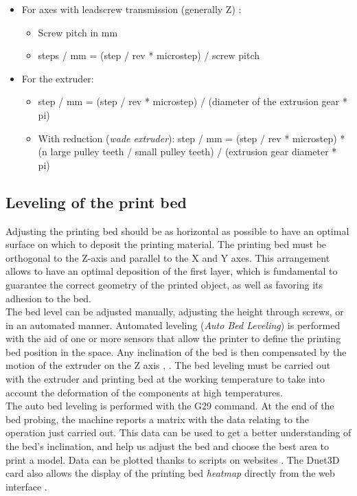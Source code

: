 \begin{itemize}
\item For axes with leadscrew transmission (generally Z) \parencite{Reference51}:

\begin{itemize}
\item Screw pitch in mm
\item steps / mm = (step / rev * microstep) / screw pitch
\end{itemize}

\item For the extruder:

\begin {itemize}
\item step / mm = (step / rev * microstep) / (diameter of the extrusion gear * pi)
\item With reduction (\emph{wade extruder}): step / mm = (step / rev * microstep) * (n large pulley teeth / small pulley teeth) / (extrusion gear diameter * pi)
\end{itemize}

\end{itemize}

\subsection{Leveling of the print bed}
Adjusting the printing bed should be as horizontal as possible to have an optimal surface on which to deposit the printing material. The printing bed must be orthogonal to the Z-axis and parallel to the X and Y axes. This arrangement allows to have an optimal deposition of the first layer, which is fundamental to guarantee the correct geometry of the printed object, as well as favoring its adhesion to the bed. \\
The bed level can be adjusted manually, adjusting the height through screws, or in an automated manner. Automated leveling (\emph{Auto Bed Leveling}) is performed with the aid of one or more sensors that allow the printer to define the printing bed position in the space. Any inclination of the bed is then compensated by the motion of the extruder on the Z axis \parencite{Reference7}, \parencite{Reference8}. The bed leveling must be carried out with the extruder and printing bed at the working temperature to take into account the deformation of the components at high temperatures. \\
The auto bed leveling is performed with the G29 command. At the end of the bed probing, the machine reports a matrix with the data relating to the operation just carried out. This data can be used to get a better understanding of the bed's inclination, and help us adjust the bed and choose the best area to print a model.
Data can be plotted thanks to scripts on websites \parencite{Reference9}. The Duet3D card also allows the display of the printing bed \emph{heatmap} directly from the web interface \parencite{Reference10}.

